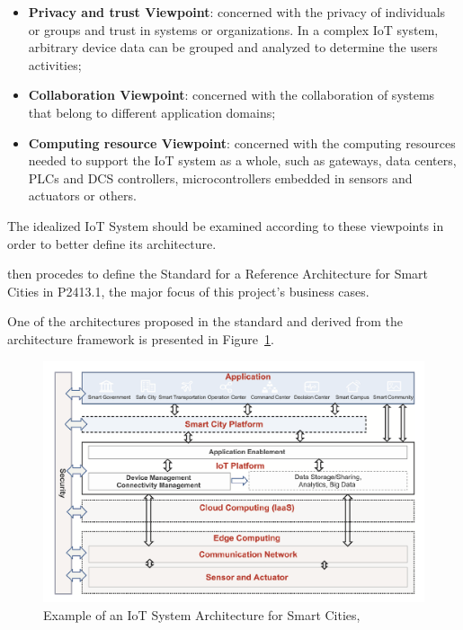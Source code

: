 \begin{itemize}
    \item \textbf{Privacy and trust Viewpoint}: concerned with the privacy of individuals or groups and trust in systems or organizations. In a complex \gls{IoT} system, arbitrary device data can be grouped and analyzed to determine the users activities;
    \item \textbf{Collaboration Viewpoint}: concerned with the collaboration of systems that belong to different application domains;
    \item \textbf{Computing resource Viewpoint}: concerned with the computing resources needed to support the \gls{IoT} system as a whole, such as gateways, data centers, \gls{PLC}s and \gls{DCS} controllers, microcontrollers embedded in sensors and actuators or others.
\end{itemize}

The idealized \gls{IoT} System should be examined according to these viewpoints in order to better define its architecture.

\cite{9032420} then procedes to define the Standard for a Reference Architecture for Smart Cities in P2413.1, the major focus of this project's business cases.

One of the architectures proposed in the standard and derived from the architecture framework is presented in Figure~\ref{fig:stateofart:arch:p2413:rasc}. 

\begin{figure}[H]
    \centering
    \includegraphics[scale=0.4]{assets/figures/smart-city-p2413.png}
    \caption[Example of an \gls{IoT} System Architecture for Smart Cities]{Example of an \gls{IoT} System Architecture for Smart Cities, \cite{9032420}}
    \label{fig:stateofart:arch:p2413:rasc}
\end{figure}


